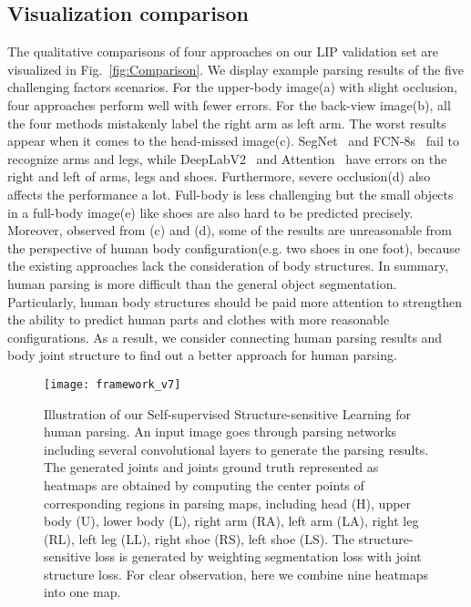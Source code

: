 \documentclass[10pt,twocolumn,letterpaper]{article}
\begin{document}
\subsection{Visualization comparison}
The qualitative comparisons of four approaches on our LIP validation set are visualized in Fig.~\ref{fig:Comparison}. We display example parsing results of the five challenging factors scenarios. For the upper-body image(a) with slight occlusion, four approaches perform well with fewer errors. For the back-view image(b), all the four methods mistakenly label the right arm as left arm. The worst results appear when it comes to the head-missed image(c). SegNet~\cite{badrinarayanan2015segnet} and FCN-8s~\cite{long2014fully} fail to recognize arms and legs, while DeepLabV2~\cite{chen2014semantic} and Attention~\cite{chen2015attention} have errors on the right and left of arms, legs and shoes. Furthermore, severe occlusion(d) also affects the performance a lot. Full-body is less challenging but the small objects in a full-body image(e) like shoes are also hard to be predicted precisely. Moreover, observed from (c) and (d), some of the results are unreasonable from the perspective of human body configuration(e.g. two shoes in one foot), because the existing approaches lack the consideration of body structures. In summary, human parsing is more difficult than the general object segmentation. Particularly, human body structures should be paid more attention to strengthen the ability to predict human parts and clothes with more reasonable configurations. As a result, we consider connecting human parsing results and body joint structure to find out a better approach for human parsing.
\begin{figure*}[t]
\centering
   \texttt{[image: framework\_v7]}
\vspace{-2mm}
\caption{Illustration of our Self-supervised Structure-sensitive Learning for human parsing. An input image goes through parsing networks including several convolutional layers to generate the parsing results. The generated joints and joints ground truth represented as heatmaps are obtained by computing the center points of corresponding regions in parsing maps, including head (H), upper body (U), lower body (L), right arm (RA), left arm (LA), right leg (RL), left leg (LL), right shoe (RS), left shoe (LS). The structure-sensitive loss is generated by weighting segmentation loss with joint structure loss. For clear observation, here we combine nine heatmaps into one map.}
\label{fig:framework}
\vspace{-6mm}
\end{figure*}
\end{document}
